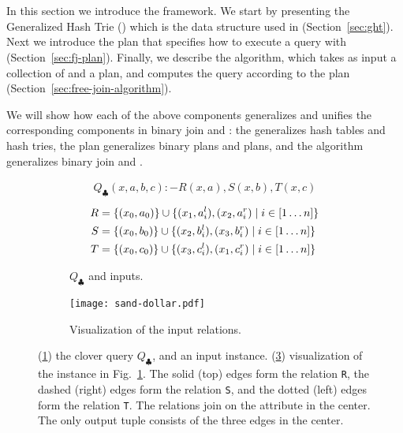 \section{\FJ}\label{sec:free-join}

In this section we introduce the \FJ framework.
We start by presenting the Generalized Hash Trie (\GHT) which
is the data structure used in \FJ (Section~\ref{sec:ght}).
Next we introduce the \FJ plan that specifies
how to execute a query with \FJ (Section~\ref{sec:fj-plan}).
Finally, we describe the \FJ algorithm,
which takes as input a collection of \GHTs
and a \FJ plan,
and computes the query according to the plan (Section~\ref{sec:free-join-algorithm}).

We will show how each of the above components generalizes
and unifies the corresponding components in binary join
and \GJ:
the \GHT generalizes hash tables and hash tries,
the \FJ plan generalizes binary plans and \GJ plans, and
the \FJ algorithm generalizes binary join and \GJ.

\begin{figure}
  \begin{subfigure}[b]{0.4\linewidth}
    \begin{align*}
      Q_{\clubsuit}(x,a,b,c) :- R(x,a),S(x,b),T(x,c)
    \end{align*}
    \begin{align*}
      R & = \{(x_0, a_0)\} \cup \{{(x_1, a_i^l), (x_2, a_i^r)}\mid{i \in [1 \ldots n]}\} \\
      S & = \{(x_0, b_0)\} \cup \{{(x_2, b_i^l), (x_3, b_i^r)}\mid{i \in [1 \ldots n]}\} \\
      T & = \{(x_0, c_0)\} \cup \{{(x_3, c_i^l), (x_1, c_i^r)}\mid{i \in [1 \ldots n]}\}
    \end{align*}
    \caption{$Q_\clubsuit$ and inputs.}
    \label{fig:clover-query}
  \end{subfigure}
  \begin{subfigure}[b]{0.5\linewidth}
    \centering
    \texttt{[image: sand-dollar.pdf]}
    \caption{Visualization of the input relations.}
    \label{fig:clover-vis}
  \end{subfigure}
  \caption{(\ref{fig:clover-query}) the clover query $Q_\clubsuit$, and an input instance.
    (\ref{fig:clover-vis}) visualization of the instance in
    Fig.~\ref{fig:clover-query}. The solid (top) edges form the relation
    \texttt{R}, the dashed (right) edges form the relation \texttt{S},
    and the dotted (left) edges form the relation \texttt{T}.  The
    relations join on the attribute in the center.  The only output
    tuple consists of the three edges in the center. }
\end{figure}


